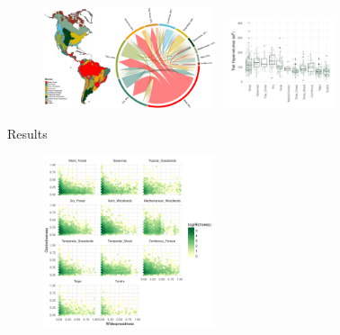 \documentclass[final]{beamer}
\newlength{\sepwid}
\newlength{\onecolwid}
\newlength{\twocolwid}
\begin{document}
\begin{frame}[t]
\begin{columns}[t]
\begin{column}{\twocolwid}
\begin{figure}[h]
	\centering
	\includegraphics[width=0.5\textwidth]{./figures/Figure1.pdf}
	~
	\includegraphics[width=0.3\textwidth]{./figures/Hypervolume_sp_sample_gaussian20perc.pdf}
	\caption{}
	\label{fig:map}
\end{figure}


		 \begin{block}{Results}


\begin{figure}[h]
	\centering
	\includegraphics[width=0.5\textwidth]{./figures/All_biomes_heatmap_logTraits.pdf}
	\caption{}
	\label{}
\end{figure}





		 \end{block}


 \end{column}



  \begin{column}{\sepwid}\end{column}			%
  \begin{column}{\onecolwid}




\end{column}
\end{columns}
\end{frame}
\end{document}
